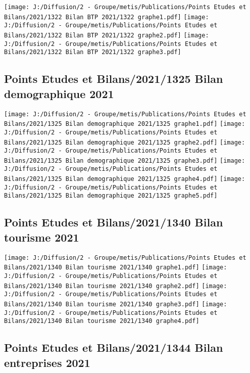 \documentclass[
]{article}
\begin{document}
\texttt{[image: J:/Diffusion/2 - Groupe/metis/Publications/Points Etudes et Bilans/2021/1322 Bilan BTP 2021/1322 graphe1.pdf]}
\texttt{[image: J:/Diffusion/2 - Groupe/metis/Publications/Points Etudes et Bilans/2021/1322 Bilan BTP 2021/1322 graphe2.pdf]}
\texttt{[image: J:/Diffusion/2 - Groupe/metis/Publications/Points Etudes et Bilans/2021/1322 Bilan BTP 2021/1322 graphe3.pdf]}

\hypertarget{points-etudes-et-bilans20211325-bilan-demographique-2021}{%
\subsection{Points Etudes et Bilans/2021/1325 Bilan demographique
2021}\label{points-etudes-et-bilans20211325-bilan-demographique-2021}}

\texttt{[image: J:/Diffusion/2 - Groupe/metis/Publications/Points Etudes et Bilans/2021/1325 Bilan demographique 2021/1325 graphe1.pdf]}
\texttt{[image: J:/Diffusion/2 - Groupe/metis/Publications/Points Etudes et Bilans/2021/1325 Bilan demographique 2021/1325 graphe2.pdf]}
\texttt{[image: J:/Diffusion/2 - Groupe/metis/Publications/Points Etudes et Bilans/2021/1325 Bilan demographique 2021/1325 graphe3.pdf]}
\texttt{[image: J:/Diffusion/2 - Groupe/metis/Publications/Points Etudes et Bilans/2021/1325 Bilan demographique 2021/1325 graphe4.pdf]}
\texttt{[image: J:/Diffusion/2 - Groupe/metis/Publications/Points Etudes et Bilans/2021/1325 Bilan demographique 2021/1325 graphe5.pdf]}

\hypertarget{points-etudes-et-bilans20211340-bilan-tourisme-2021}{%
\subsection{Points Etudes et Bilans/2021/1340 Bilan tourisme
2021}\label{points-etudes-et-bilans20211340-bilan-tourisme-2021}}

\texttt{[image: J:/Diffusion/2 - Groupe/metis/Publications/Points Etudes et Bilans/2021/1340 Bilan tourisme 2021/1340 graphe1.pdf]}
\texttt{[image: J:/Diffusion/2 - Groupe/metis/Publications/Points Etudes et Bilans/2021/1340 Bilan tourisme 2021/1340 graphe2.pdf]}
\texttt{[image: J:/Diffusion/2 - Groupe/metis/Publications/Points Etudes et Bilans/2021/1340 Bilan tourisme 2021/1340 graphe3.pdf]}
\texttt{[image: J:/Diffusion/2 - Groupe/metis/Publications/Points Etudes et Bilans/2021/1340 Bilan tourisme 2021/1340 graphe4.pdf]}

\hypertarget{points-etudes-et-bilans20211344-bilan-entreprises-2021}{%
\subsection{Points Etudes et Bilans/2021/1344 Bilan entreprises
2021}\label{points-etudes-et-bilans20211344-bilan-entreprises-2021}}
\end{document}

